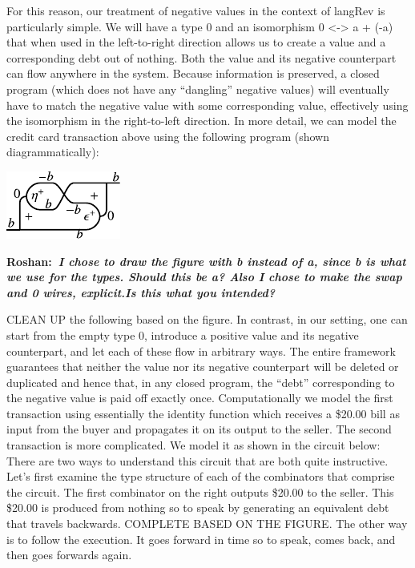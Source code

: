 \documentclass[preprint]{sigplanconf}
\newcommand{\xcomment}[2]{\textbf{#1:~\textsl{#2}}}
\newcommand{\roshan}[1]{\xcomment{Roshan}{#1}}
\begin{document}
{For this reason, our treatment of negative values in the context of
{{langRev}} is particularly simple. We will have a type $0$ and an
isomorphism {{0 <-> a + (-a)}} that when used in the left-to-right direction
allows us to create a value and a corresponding debt out of nothing. Both the
value and its negative counterpart can flow anywhere in the system. Because
information is preserved, a closed program (which does not have any
``dangling'' negative values) will eventually have to match the negative
value with some corresponding value, effectively using the isomorphism in the
right-to-left direction. In more detail, we can model the credit card
transaction above using the following program (shown diagrammatically):

\begin{center}
  \includegraphics{diagrams/algebra1.pdf}
\end{center}

\roshan{I chose to draw the figure with b instead of a, since b is what
  we use for the types. Should this be a? Also I chose to make the
  swap and 0 wires, explicit.Is this what you intended? }

CLEAN UP the following based on the figure. In contrast, in our setting, one
can start from the empty type $0$, introduce a positive value and its
negative counterpart, and let each of these flow in arbitrary ways. The
entire framework guarantees that neither the value nor its negative
counterpart will be deleted or duplicated and hence that, in any closed
program, the ``debt'' corresponding to the negative value is paid off exactly
once. Computationally we model the first transaction using essentially the
identity function which receives a \$20.00 bill as input from the buyer and
propagates it on its output to the seller. The second transaction is more
complicated. We model it as shown in the circuit below: There are two ways to
understand this circuit that are both quite instructive. Let's first examine
the type structure of each of the combinators that comprise the circuit. The
first combinator on the right outputs \$20.00 to the seller. This \$20.00 is
produced from nothing so to speak by generating an equivalent debt that
travels backwards. COMPLETE BASED ON THE FIGURE. The other way is to follow
the execution. It goes forward in time so to speak, comes back, and then goes
forwards again.

}
\end{document}

